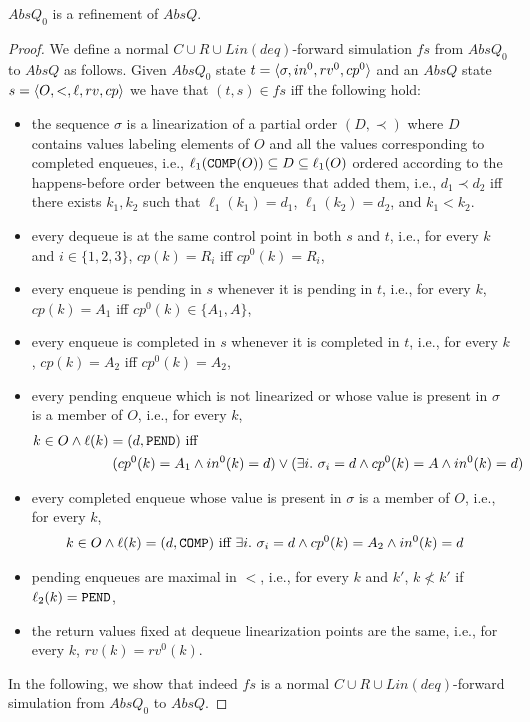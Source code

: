 \begin{lemma} 
$AbsQ_0$ is a refinement of $AbsQ$.
\end{lemma}
\begin{proof}
We define a normal $C\cup R\cup Lin(deq)$-forward simulation $fs$ from $AbsQ_0$ to $AbsQ$ as follows. 
Given $AbsQ_0$ state $t=\langle {\sigma,in^0,rv^0,cp^0} \rangle$ and an $AbsQ$ state $s=\langle {O,<,\ell,rv,cp} \rangle$ we have that $(t,s)\in fs$ iff the following hold:
\begin{itemize}
	\item the sequence $\sigma$ is a linearization of a partial order $(D,\prec)$ where $D$ contains values labeling elements of $O$ and all the values corresponding to completed enqueues, i.e., $\ell_1({\tt COMP}(O))\subseteq D\subseteq \ell_1(O)$ ordered according to the happens-before order between the enqueues that added them, i.e., $d_1\prec d_2$ if{f} there exists $k_1,k_2$ such that $\ell_1(k_1)=d_1$, $\ell_1(k_2)=d_2$, and $k_1 < k_2$.
	\item every dequeue is at the same control point in both $s$ and $t$, i.e., for every $k$ and $i\in \{1,2,3\}$, $cp(k)=R_i$ iff $cp^0(k)=R_i$,
	\item every enqueue is pending in $s$ whenever it is pending in $t$, i.e., for every $k$, $cp(k)=A_1$ iff $cp^0(k)\in \{A_1,A\}$,
	\item every enqueue is completed in $s$ whenever it is completed in $t$, i.e., for every $k$, $cp(k)=A_2$ iff $cp^0(k) = A_2$,
	\item every pending enqueue which is not linearized or whose value is present in $\sigma$ is a member of $O$, i.e., for every $k$, 
	\begin{align*}
	&k\in O\land \ell(k)=(d,{\tt PEND})\mbox{ iff } \\
	&\hspace{2cm}(cp^0(k)=A_1\land in^0(k)=d)\vee (\exists i.\ \sigma_i =d\land cp^0(k)=A\land in^0(k)=d)
	\end{align*}
	\item every completed enqueue whose value is present in $\sigma$ is a member of $O$, i.e., for every $k$, 
	\begin{align*}
	&k\in O\land \ell(k)=(d,{\tt COMP})\mbox{ iff } \exists i.\ \sigma_i =d\land cp^0(k)=A_2\land in^0(k)=d
	\end{align*}
	\item pending enqueues are maximal in $<$, i.e., for every $k$ and $k'$, $k \not< k'$ if $\ell_2(k)={\tt PEND}$,
	\item the return values fixed at dequeue linearization points are the same, i.e., for every $k$, $rv(k)=rv^0(k)$.
\end{itemize}
In the following, we show that indeed $fs$ is a normal $C\cup R\cup Lin(deq)$-forward simulation from $AbsQ_0$ to $AbsQ$.


\end{proof}
